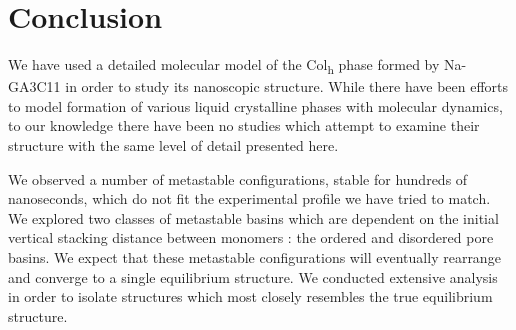 \documentclass[journal=jpcbfk,manusciprt=article]{achemso}
\begin{document}
 
  \section{Conclusion}
  
  We have used a detailed molecular model of the Col\textsubscript{h} phase
  formed by Na-GA3C11 in order to study its nanoscopic structure. While there
  have been efforts to model formation of various liquid crystalline phases with
  molecular dynamics, to our knowledge there have been no studies which attempt
  to examine their structure with the same level of detail presented here.
  
  We observed a number of metastable configurations, stable for hundreds of 
  nanoseconds, which do not fit the experimental profile we have tried to match. 
  We explored two classes of metastable basins which are dependent on the initial
  vertical stacking distance between monomers : the ordered and disordered pore basins.
  We expect that these metastable configurations will eventually rearrange and converge
  to a single equilibrium structure. We conducted extensive analysis in order to 
  isolate structures which most closely resembles the true equilibrium structure.
\end{document}

